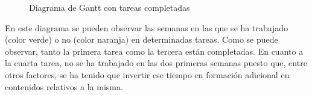 \begin{figure}[H]
	{\fontsize{3}{4}\selectfont
		\centering
    	\def\svgscale{0.185}
    	
    	\caption{Diagrama de Gantt con tareas completadas}
    	\label{trabajo_realizado}
	}
\end{figure}

En este diagrama se pueden observar las semanas en las que se ha trabajado (color verde) o no (color naranja) en determinadas tareas. Como se puede observar, tanto la primera tarea como la tercera están completadas. En cuanto a la cuarta tarea, no se ha trabajado en las dos primeras semanas puesto que, entre otros factores, se ha tenido que invertir ese tiempo en formación adicional en contenidos relativos a la misma.
